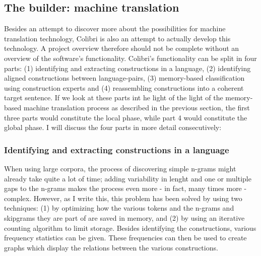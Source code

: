 \documentclass[12pt]{article}
\begin{document}
\subsection{The builder: machine translation}
Besides an attempt to discover more about the possibilities for machine translation technology, Colibri is also an attempt to actually develop this technology. A project overview therefore should not be complete without an overview of the software's functionality. Colibri's functionality can be split in four parts: (1) identifying and extracting constructions in a language, (2) identifying aligned constructions between language-pairs, (3) memory-based classification using construction experts and (4) reassembling constructions into a coherent target sentence. If we look at these parts int he light of the light of the memory-based machine translation process as described in the previous section, the first three parts would constitute the local phase, while part 4 would constitute the global phase. I will discuss the four parts in more detail consecutively:

\subsubsection{Identifying and extracting constructions in a language}
When using large corpora, the process of discovering simple n-grams might already take quite a lot of time; adding variability in lenght and one or multiple gaps to the n-grams makes the process even more - in fact, many times more - complex. However, as I write this, this problem has been solved by using two techniques: (1) by optimizing how the various tokens and the n-grams and skipgrams they are part of are saved in memory, and (2) by using an iterative counting algorithm to limit storage. Besides identifying the constructions, various frequency statistics can be given. These frequencies can then be used to create graphs which display the relations between the various constructions.

\end{document}
